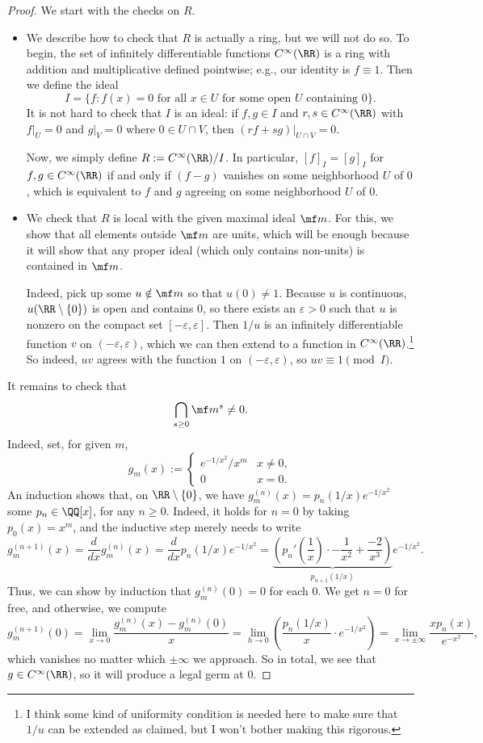 \begin{proof}
	We start with the checks on $R$.
	\begin{itemize}
		\item We describe how to check that $R$ is actually a ring, but we will not do so. To begin, the set of infinitely differentiable functions $C^\infty(\RR)$ is a ring with addition and multiplicative defined pointwise; e.g., our identity is $f\equiv1$. Then we define the ideal
		\[I=\{f:f(x)=0\text{ for all }x\in U\text{ for some open }U\text{ containing }0\}.\]
		It is not hard to check that $I$ is an ideal: if $f,g\in I$ and $r,s\in C^\infty(\RR)$ with $f|_U=0$ and $g|_V=0$ where $0\in U\cap V$, then $(rf+sg)|_{U\cap V}=0$.

		Now, we simply define $R:=C^\infty(\RR)/I$. In particular, $[f]_I=[g]_I$ for $f,g\in C^\infty(\RR)$ if and only if $(f-g)$ vanishes on some neighborhood $U$ of $0$, which is equivalent to $f$ and $g$ agreeing on some neighborhood $U$ of $0$.

		\item We check that $R$ is local with the given maximal ideal $\mf m$. For this, we show that all elements outside $\mf m$ are units, which will be enough because it will show that any proper ideal (which only contains non-units) is contained in $\mf m$.

		Indeed, pick up some $u\notin\mf m$ so that $u(0)\ne1$. Because $u$ is continuous, $u(\RR\setminus\{0\})$ is open and contains $0$, so there exists an $\varepsilon>0$ such that $u$ is nonzero on the compact set $[-\varepsilon,\varepsilon]$. Then $1/u$ is an infinitely differentiable function $v$ on $(-\varepsilon,\varepsilon)$, which we can then extend to a function in $C^\infty(\RR)$.\footnote{I think some kind of uniformity condition is needed here to make sure that $1/u$ can be extended as claimed, but I won't bother making this rigorous.} So indeed, $uv$ agrees with the function $1$ on $(-\varepsilon,\varepsilon)$, so $uv\equiv1\pmod I$.
	\end{itemize}
	It remains to check that
	\[\bigcap_{s\ge0}\mf m^s\ne0.\]
	Indeed, set, for given $m$,
	\[g_m(x):=\begin{cases}
		e^{-1/x^2}/x^m & x\ne0, \\
		0 & x=0.
	\end{cases}\]
	An induction shows that, on $\RR\setminus\{0\}$, we have $g_m^{(n)}(x)=p_n(1/x)e^{-1/x^2}$ some $p_n\in\QQ[x]$, for any $n\ge0$. Indeed, it holds for $n=0$ by taking $p_0(x)=x^m$, and the inductive step merely needs to write
	\[g_m^{(n+1)}(x)=\frac d{dx}g_m^{(n)}(x)=\frac d{dx}p_n(1/x)e^{-1/x^2}=\underbrace{\left(p_n'\left(\frac1x\right)\cdot-\frac1{x^2}+\frac{-2}{x^3}\right)}_{p_{n+1}(1/x)}e^{-1/x^2}.\]
	Thus, we can show by induction that $g^{(n)}_m(0)=0$ for each $0$. We get $n=0$ for free, and otherwise, we compute
	\[g_m^{(n+1)}(0)=\lim_{x\to0}\frac{g_m^{(n)}(x)-g_m^{(n)}(0)}x=\lim_{h\to0}\left(\frac{p_n(1/x)}x\cdot e^{-1/x^2}\right)=\lim_{x\to\pm\infty}\frac{xp_n(x)}{e^{-x^2}},\]
	which vanishes no matter which $\pm\infty$ we approach. So in total, we see that $g\in C^\infty(\RR)$, so it will produce a legal germ at $0$.
	

\end{proof}

